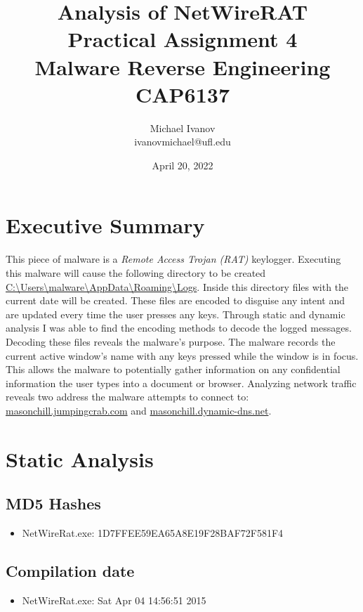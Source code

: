 \documentclass{article}
\title{Analysis of NetWireRAT\\Practical Assignment 4\\Malware Reverse Engineering \\
CAP6137}
\author{Michael Ivanov \\
ivanovmichael@ufl.edu}
\date{April 20, 2022}
\begin{document}
    \maketitle
    \pagebreak
    \section{Executive Summary}
    This piece of malware is a \textit{Remote Access Trojan (RAT)} keylogger. Executing this malware will cause the following directory to be created \url{C:\Users\malware\AppData\Roaming\Logs}. Inside this directory files with the current date will be created. These files are encoded to disguise any intent and are updated every time the user presses any keys. Through static and dynamic analysis I was able to find the encoding methods to decode the logged messages. Decoding these files reveals the malware's purpose. The malware records the current active window's name with any keys pressed while the window is in focus. This allows the malware to potentially gather information on any confidential information the user types into a document or browser. Analyzing network traffic reveals two address the malware attempts to connect to: \url{masonchill.jumpingcrab.com} and \url{masonchill.dynamic-dns.net}.
    \pagebreak
    \section{Static Analysis}
    \subsection{MD5 Hashes}
    \begin{itemize}
        \item NetWireRat.exe: 1D7FFEE59EA65A8E19F28BAF72F581F4 \Cite{malwareSample}
    \end{itemize}
    \subsection{Compilation date}
    \begin{itemize}
        \item NetWireRat.exe: Sat Apr 04 14:56:51 2015
    \end{itemize}
\end{document}
